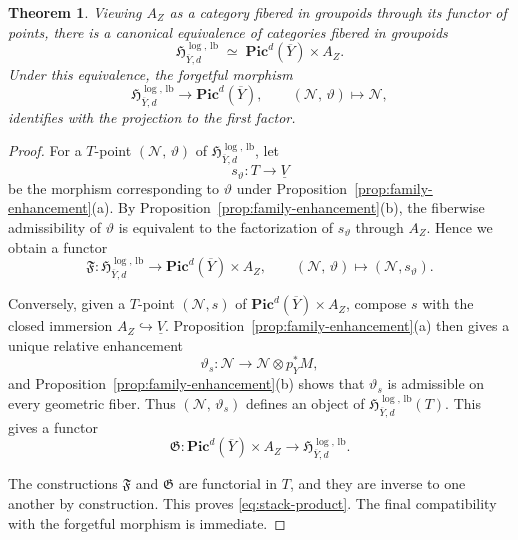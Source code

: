 \documentclass[a4paper,12pt]{amsart}
\numberwithin{equation}{section}
\newtheorem{theorem}{Theorem}[section]
\theoremstyle{definition}
\begin{document}
\begin{theorem}\label{thm:stack-product}
Viewing \(A_Z\) as a category fibered in groupoids through its functor of points, there is a canonical equivalence of categories fibered in groupoids
\begin{equation}\label{eq:stack-product}
\mathfrak H^{\log,\,\mathrm{lb}}_{\overline{Y},d}
\;\simeq\;
\mathbf{Pic}^d(\overline{Y})\times A_Z.
\end{equation}
Under this equivalence, the forgetful morphism
\[
\mathfrak H^{\log,\,\mathrm{lb}}_{\overline{Y},d}\longrightarrow \mathbf{Pic}^d(\overline{Y}),
\qquad
(\mathcal N,\,\vartheta)\longmapsto \mathcal N,
\]
identifies with the projection to the first factor.
\end{theorem}
\begin{proof}
For a \(T\)-point \((\mathcal N,\,\vartheta)\) of \(\mathfrak H^{\log,\,\mathrm{lb}}_{\overline{Y},d}\), let
\[
s_\vartheta:T\longrightarrow \underline{V}
\]
be the morphism corresponding to \(\vartheta\) under Proposition~\ref{prop:family-enhancement}\textup{(a)}.  By Proposition~\ref{prop:family-enhancement}\textup{(b)}, the fiberwise admissibility of \(\vartheta\) is equivalent to the factorization of \(s_\vartheta\) through \(A_Z\).  Hence we obtain a functor
\[
\mathfrak F:
\mathfrak H^{\log,\,\mathrm{lb}}_{\overline{Y},d}
\longrightarrow
\mathbf{Pic}^d(\overline{Y})\times A_Z,
\qquad
(\mathcal N,\,\vartheta)\longmapsto (\mathcal N,s_\vartheta).
\]

Conversely, given a \(T\)-point \((\mathcal N,s)\) of \(\mathbf{Pic}^d(\overline{Y})\times A_Z\), compose \(s\) with the closed immersion \(A_Z\hookrightarrow \underline{V}\).  Proposition~\ref{prop:family-enhancement}\textup{(a)} then gives a unique relative enhancement
\[
\vartheta_s:\mathcal N\longrightarrow \mathcal N\otimes p_Y^*M,
\]
and Proposition~\ref{prop:family-enhancement}\textup{(b)} shows that \(\vartheta_s\) is admissible on every geometric fiber.  Thus \((\mathcal N,\,\vartheta_s)\) defines an object of \(\mathfrak H^{\log,\,\mathrm{lb}}_{\overline{Y},d}(T)\).  This gives a functor
\[
\mathfrak G:
\mathbf{Pic}^d(\overline{Y})\times A_Z
\longrightarrow
\mathfrak H^{\log,\,\mathrm{lb}}_{\overline{Y},d}.
\]

The constructions \(\mathfrak F\) and \(\mathfrak G\) are functorial in \(T\), and they are inverse to one another by construction.  This proves \eqref{eq:stack-product}.  The final compatibility with the forgetful morphism is immediate.
\end{proof}
\end{document}
